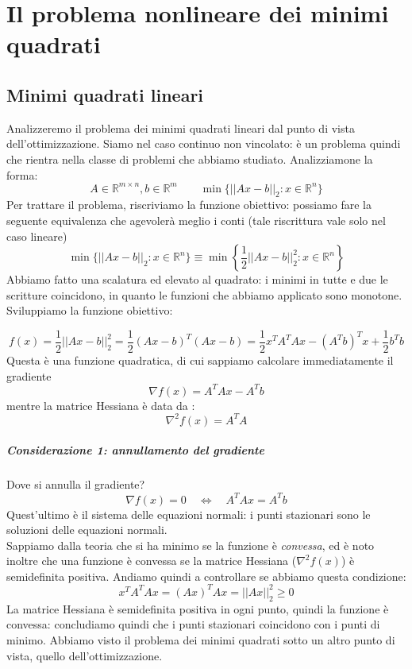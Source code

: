 


\inbpdocument 

\chapter{Il problema nonlineare dei minimi quadrati}
\section{Minimi quadrati lineari}
Analizzeremo il problema dei minimi quadrati lineari dal punto di vista
dell'ottimizzazione. Siamo nel caso continuo non vincolato:
è un problema quindi che rientra nella classe di problemi
che abbiamo studiato. Analizziamone la forma:
$$ A \in \mathbb{R}^{m \times n}, b \in \mathbb{R}^{m} \qquad
 \min \{ || Ax -b ||_{2} : x \in \mathbb{R}^{n} \} $$
Per trattare il problema, riscriviamo la funzione obiettivo:
possiamo fare la seguente equivalenza che  agevoler\`a
meglio i conti (tale riscrittura vale solo nel caso lineare)
$$ \min \{ || Ax -b ||_{2} : x \in \mathbb{R}^{n} \} 
 \equiv
 \min \left\{ \frac{1}{2} || Ax -b ||_{2}^{2} : x \in \mathbb{R}^{n} \right\}
 $$
Abbiamo fatto una scalatura ed elevato al quadrato:
i minimi in tutte e due le scritture coincidono, in quanto
le funzioni che abbiamo applicato sono monotone.
Sviluppiamo la funzione obiettivo:

$$ f(x) = \frac{1}{2} || Ax - b ||_{2}^{2} = \frac{1}{2}(Ax-b)^{T}(Ax-b) =
\frac{1}{2}x^{T} A^{T}A x - (A^{T}b)^{T}x + \frac{1}{2} b^{T}b $$
Questa \`e una  funzione quadratica, di cui sappiamo calcolare immediatamente
il gradiente 
$$ \nabla f(x) = A^{T}A x - A^{T}b $$
mentre la matrice Hessiana \`e data da :
$$ \nabla^{2}f(x) = A^{T}A$$

\paragraph{Considerazione 1: annullamento del gradiente}
Dove si annulla il gradiente?
$$ \nabla f(x) = 0 \quad
 \Longleftrightarrow \quad 
A^{T}A x = A^{T}b $$
Quest'ultimo è il sistema delle equazioni normali: i punti stazionari
sono le soluzioni delle equazioni normali. \\
Sappiamo dalla teoria che si ha minimo se la funzione è \emph{convessa},
ed \`e noto inoltre che una funzione \`e convessa se la matrice Hessiana
($\nabla^{2}f(x)$) \`e semidefinita positiva.
Andiamo quindi a controllare se abbiamo questa condizione:
$$ x^{T} A^{T}A x = (Ax)^{T}Ax = || Ax||_{2}^{2} \geq 0$$
La matrice Hessiana \`e semidefinita positiva in ogni punto, quindi
la funzione è convessa: concludiamo quindi che i punti stazionari
coincidono con i punti di minimo. Abbiamo visto il problema dei minimi quadrati sotto un altro punto di vista, quello dell'ottimizzazione.

